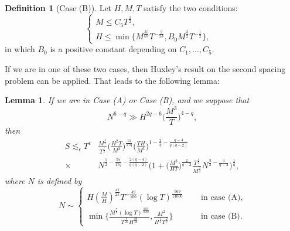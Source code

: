 \documentclass[11pt]{amsart}
\numberwithin{equation}{section}
\newtheorem{lemma}[theorem]{Lemma}
\theoremstyle{definition}
\newtheorem{definition}{Definition}[section]
\theoremstyle{proposition}
\begin{document}
\begin{definition}  [Case (B)]  \label{case B definition}
Let $H,M,T$ satisfy the two conditions:
\begin{equation}   \label{case B}
\begin{cases}
M \le  C_5 T^{\frac{1}{2}},  &
\\ H \le  \min\{M^{\frac{35}{69}}T^{-\frac{2}{23}}, B_0 M^{\frac{3}{2}}T^{-\frac{1}{2}}\}, &
\end{cases}    
\end{equation}
in which $B_0$ is a positive constant depending on $C_1,...,C_5$.   
\end{definition}
If we are in one of these two cases, then Huxley's result \cite{Huxley03} on the second spacing problem can be applied. That leads to the following lemma:  
\begin{lemma}   \label{main lemma-111} 
If we are in Case (A) or Case (B), and we suppose that 
\begin{equation}  \label{condition 1---'}
N^{6-q}\gg H^{2q-6} \Big(\frac{M^3}{T} \Big)^{4-q},    
\end{equation}
then
\begin{equation}   \label{upper bound middle form}
\begin{split}
S \lesssim_\epsilon T^\epsilon & \frac{M^{\frac{5}{2}}}{T^{\frac{1}{2}}} \Big(\frac{H^2 T}{M^3}\Big)^{\frac{11}{17q}} \Big(\frac{TH}{M^3}\Big)^{1-\frac{2}{q}-\frac{q-4}{q(q-2)}}  
\\ \times &   N^{\frac{1}{2}-\frac{57}{17q}-\frac{2(q-4)}{q(q-2)}}\Big(1+\Big(\frac{M^3}{HT}\Big)^{\frac{2}{q-2}}\frac{T^{\frac{1}{2}}}{M^{\frac{3}{2}}} N^{\frac{3}{2}-\frac{4}{q-2}}\Big)^{\frac{1}{q}}, 
\end{split}
\end{equation}
where $N$ is defined by
\begin{equation}  \label{definition of N}
N\sim  \begin{cases}
H (\frac{M}{H})^{\frac{41}{25}} T^{-\frac{49}{100}} (\log T)^{\frac{969}{14000}} \quad   & \text{ in case (A)}, 
\\ \min\Big\{ \frac{M^{\frac{7}{8}}(\log T)^{\frac{969}{5600}}}{T^{\frac{3}{20}}H^{\frac{29}{40}}}, \frac{M^2}{H^{\frac{1}{3}}T^{\frac{2}{3}}}  \Big\}  \quad & \text{ in case (B)}.
\end{cases}    
\end{equation} 
\end{lemma}

\vspace{0.5cm}
\end{document}
